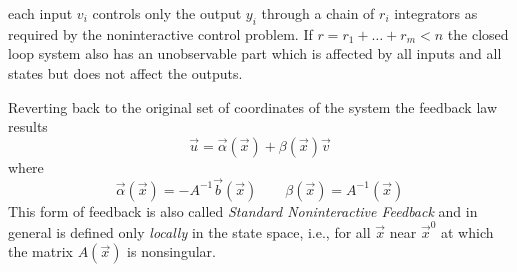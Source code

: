 each input $v_{i}$ controls only the output $y_{i}$ through a chain of
$r_{i}$ integrators as required by the noninteractive control problem.
If $r = r_{1} + \hdots + r_{m} < n$ the closed loop system also has an unobservable
part which is affected by all inputs and all states but does not affect the outputs.
\par
Reverting back to the original set of coordinates of the system the feedback law
results
\[
\vec{u} = \vec{\alpha}(\vec{x}) + \beta(\vec{x})\vec{v}
\]
where
\[
\vec{\alpha}(\vec{x}) = -A^{-1}\vec{b}(\vec{x})\qquad \beta(\vec{x}) = A^{-1}(\vec{x})
\]
This form of feedback is also called \emph{Standard Noninteractive Feedback} and in general
is defined only \emph{locally} in the state space, i.e., for all $\vec{x}$ near $\vec{x}^0$
at which the matrix $A(\vec{x})$ is nonsingular.

